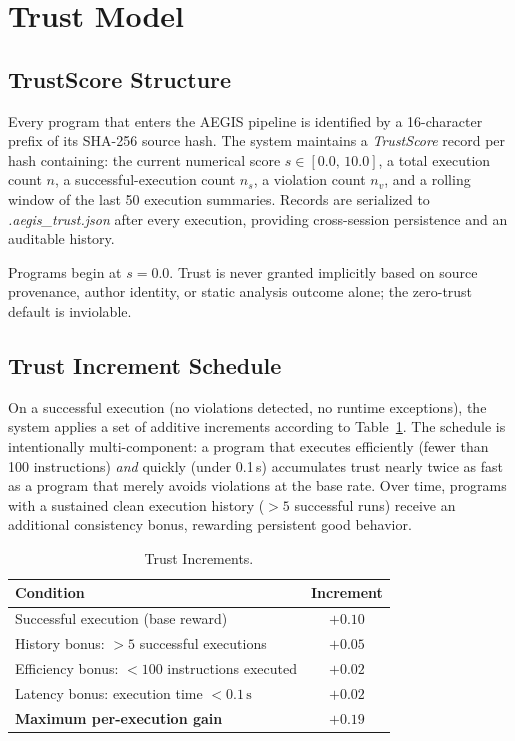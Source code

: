 \documentclass[conference]{IEEEtran}
\begin{document}
\section{Trust Model}
\label{sec:trust}

\subsection{TrustScore Structure}

Every program that enters the AEGIS pipeline is identified by a
16-character prefix of its SHA-256 source hash. The system maintains
a \textit{TrustScore} record per hash containing: the current
numerical score $s \in [0.0,\,10.0]$, a total execution count $n$,
a successful-execution count $n_s$, a violation count $n_v$, and a
rolling window of the last 50 execution summaries. Records are
serialized to \textit{.aegis\_trust.json} after every execution,
providing cross-session persistence and an auditable history.

Programs begin at $s = 0.0$. Trust is never granted implicitly
based on source provenance, author identity, or static analysis
outcome alone; the zero-trust default is inviolable.

\subsection{Trust Increment Schedule}

On a successful execution (no violations detected, no runtime
exceptions), the system applies a set of additive increments
according to Table~\ref{tab:increment}. The schedule is intentionally
multi-component: a program that executes efficiently (fewer than 100
instructions) \emph{and} quickly (under 0.1\,s) accumulates trust
nearly twice as fast as a program that merely avoids violations at
the base rate. Over time, programs with a sustained clean execution
history ($> 5$ successful runs) receive an additional consistency
bonus, rewarding persistent good behavior.

\begin{table}[t]
\caption{Trust Increments.}
\label{tab:increment}
\centering
\renewcommand{\arraystretch}{1.18}
\small
\begin{tabular}{@{} p{4.3cm} c @{}}
\toprule
\textbf{Condition} & \textbf{Increment} \\
\midrule
Successful execution (base reward)               & $+0.10$ \\
History bonus: $> 5$ successful executions       & $+0.05$ \\
Efficiency bonus: $<\!100$ instructions executed & $+0.02$ \\
Latency bonus: execution time $<\!0.1\,\text{s}$& $+0.02$ \\
\midrule
\textbf{Maximum per-execution gain}              & $\mathbf{+0.19}$\\
\bottomrule
\end{tabular}
\end{table}
\end{document}
